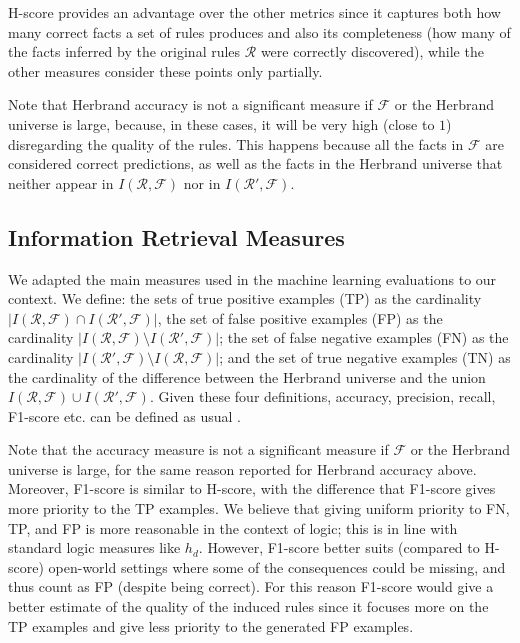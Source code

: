 \documentclass[letterpaper]{article} \usepackage{aaai20}  \usepackage{times}  \usepackage{helvet} \usepackage{courier}  \usepackage[hyphens]{url}  \usepackage{graphicx} \urlstyle{rm} \def\UrlFont{\rm}  \usepackage{graphicx}  \frenchspacing  \setlength{\pdfpagewidth}{8.5in}  \setlength{\pdfpageheight}{11in}  \usepackage{amsthm}
\theoremstyle{definition}
\begin{document}
H-score provides an advantage over the other metrics since it captures both how many correct facts a set of rules produces and also its completeness (how many of the facts inferred by the original rules $\mathcal{R}$ were correctly discovered), while the other measures consider these points only partially. 




Note that Herbrand accuracy is not a significant measure if $\mathcal{F}$ or the Herbrand universe is large, because, in these cases, it will be very high (close to $1$) disregarding the quality of the rules. This happens because all the facts in $\mathcal{F}$ are considered correct predictions, as well as the facts in the Herbrand universe that neither appear in $I(\mathcal{R},\mathcal{F})$ nor in $I(\mathcal{R}',\mathcal{F})$.


\subsection{Information Retrieval Measures}\label{sec:ml_measures}
We adapted the main measures used in the machine learning evaluations to our context.
We define: the sets of true positive examples (TP) as the cardinality  $|I(\mathcal{R},\mathcal{F}) \cap I(\mathcal{R}',\mathcal{F})|$, the set of false positive examples (FP) as the cardinality $|I(\mathcal{R},\mathcal{F}) \setminus I(\mathcal{R}',\mathcal{F})|$; the set of false negative examples (FN) as the cardinality $|I(\mathcal{R}',\mathcal{F}) \setminus I(\mathcal{R},\mathcal{F})|$; and the set of true negative examples (TN) as the cardinality of the difference between the Herbrand universe and the union  $I(\mathcal{R},\mathcal{F}) \cup I(\mathcal{R}',\mathcal{F})$.
Given these four definitions, accuracy, precision, recall, F1-score etc. can be defined as usual \cite{Russell:2009:AIM:1671238}.

Note that the accuracy measure is not a significant measure if $\mathcal{F}$ or the Herbrand universe is large, for the same reason reported for Herbrand accuracy above. 
Moreover, F1-score is similar to H-score, with the difference that F1-score gives more priority to the TP examples. We believe that giving uniform priority to FN, TP, and FP is more reasonable in the context of logic; this is in line with standard logic measures like $h_d$. However, F1-score better suits (compared to H-score) open-world settings where some of the consequences could be missing, and thus count as FP (despite being correct). For this reason F1-score would give a better estimate of the quality of the induced rules since it focuses more on the TP examples and give less priority to the generated FP examples.
\end{document}
